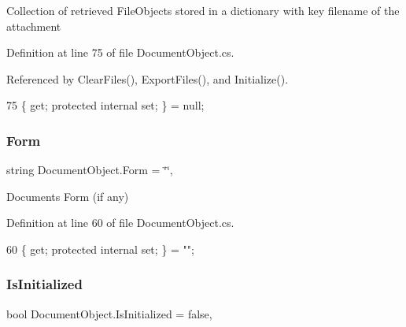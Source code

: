 Collection of retrieved File\+Objects stored in a dictionary with key filename of the attachment 



Definition at line 75 of file Document\+Object.\+cs.



Referenced by Clear\+Files(), Export\+Files(), and Initialize().


\begin{DoxyCode}
75 \{ \textcolor{keyword}{get}; \textcolor{keyword}{protected} \textcolor{keyword}{internal} \textcolor{keyword}{set}; \} = null;
\end{DoxyCode}
\mbox{\label{class_document_object_ad3444a6c018474405064070fa9a94afe}} 
\subsubsection{\texorpdfstring{Form}{Form}}
{\footnotesize\ttfamily string Document\+Object.\+Form = \char`\"{}\char`\"{}\hspace{0.3cm}{\ttfamily [get]}, {\ttfamily [set]}}



Documents Form (if any) 



Definition at line 60 of file Document\+Object.\+cs.


\begin{DoxyCode}
60 \{ \textcolor{keyword}{get}; \textcolor{keyword}{protected} \textcolor{keyword}{internal} \textcolor{keyword}{set}; \} = \textcolor{stringliteral}{""};
\end{DoxyCode}
\mbox{\label{class_document_object_a3b2075b73f38d05091b69decc6ce7992}} 
\subsubsection{\texorpdfstring{Is\+Initialized}{IsInitialized}}
{\footnotesize\ttfamily bool Document\+Object.\+Is\+Initialized = false\hspace{0.3cm}{\ttfamily [get]}, {\ttfamily [set]}}



